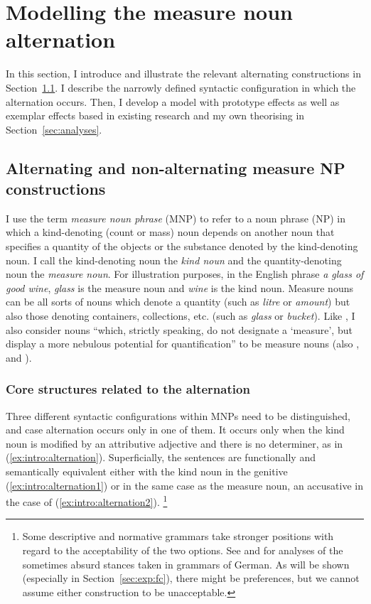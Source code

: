 \section{Modelling the measure noun alternation}
\label{sec:germanmeasurenps}

In this section, I introduce and illustrate the relevant alternating constructions in Section~\ref{sec:descriptive}.
I describe the narrowly defined syntactic configuration in which the alternation occurs.
Then, I develop a model with prototype effects as well as exemplar effects based in existing research and my own theorising in Section~\ref{sec:analyses}.

\subsection{Alternating and non-alternating measure NP constructions}
\label{sec:descriptive}

I use the term \textit{measure noun phrase} (MNP) to refer to a noun phrase (NP) in which a kind-denoting (count or mass) noun depends on another noun that specifies a quantity of the objects or the substance denoted by the kind-denoting noun.
I call the kind-denoting noun the \textit{kind noun} and the quantity-denoting noun the \textit{measure noun}.
For illustration purposes, in the English phrase \textit{a glass of good wine}, \textit{glass} is the measure noun and \textit{wine} is the kind noun.
Measure nouns can be all sorts of nouns which denote a quantity (such as \textit{litre} or \textit{amount}) but also those denoting containers, collections, etc. (such as \textit{glass} or \textit{bucket}).
Like \citet[284]{Brems2003}, I also consider nouns ``which, strictly speaking, do not designate a `measure', but display a more nebulous potential for quantification'' to be measure nouns (also \citealp[530]{Koptjevskaja2001}, and \citealp[338]{Rutkowski2007}).

\subsubsection{Core structures related to the alternation}

Three different syntactic configurations within MNPs need to be distinguished, and case alternation occurs only in one of them.
It occurs only when the kind noun is modified by an attributive adjective and there is no determiner, as in (\ref{ex:intro:alternation}).
Superficially, the sentences are functionally and semantically equivalent either with the kind noun in the genitive (\ref{ex:intro:alternation1}) or in the same case as the measure noun, an accusative in the case of (\ref{ex:intro:alternation2}).%
\footnote{Some descriptive and normative grammars take stronger positions with regard to the acceptability of the two options.
See \cite{Hentschel1993} and \cite{Zimmer2015} for analyses of the sometimes absurd stances taken in grammars of German.
As will be shown (especially in Section~\ref{sec:exp:fc}), there might be preferences, but we cannot assume either construction to be unacceptable.
}

